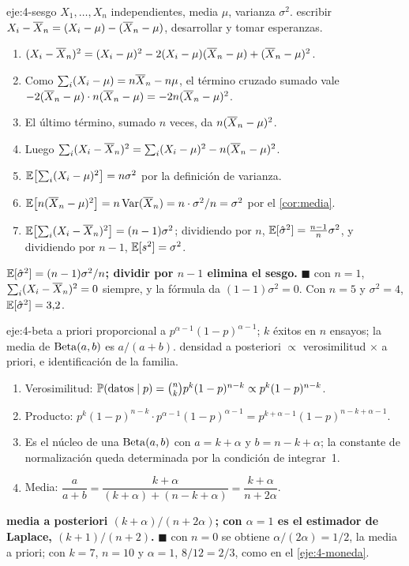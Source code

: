 \begin{solucion}{eje:4-sesgo}
\datos $X_1,\dots,X_n$ independientes, media $\mu$, varianza $\sigma^{2}$.
\planteamiento escribir $X_i-\overline{X}_n=(X_i-\mu)-(\overline{X}_n-\mu)$, desarrollar y tomar esperanzas.
\pasos
\begin{enumerate}[label=\arabic*.]
  \item $(X_i-\overline{X}_n)^{2}=(X_i-\mu)^{2}-2(X_i-\mu)(\overline{X}_n-\mu)+(\overline{X}_n-\mu)^{2}$.
  \item Como $\sum_i(X_i-\mu)=n\overline{X}_n-n\mu$, el término cruzado sumado vale $-2(\overline{X}_n-\mu)\cdot n(\overline{X}_n-\mu)=-2n(\overline{X}_n-\mu)^{2}$.
  \item El último término, sumado $n$ veces, da $n(\overline{X}_n-\mu)^{2}$.
  \item Luego $\sum_i(X_i-\overline{X}_n)^{2}=\sum_i(X_i-\mu)^{2}-n(\overline{X}_n-\mu)^{2}$.
  \item $\mathbb{E}\bigl[\sum_i(X_i-\mu)^{2}\bigr]=n\sigma^{2}$ por la definición de varianza.
  \item $\mathbb{E}\bigl[n(\overline{X}_n-\mu)^{2}\bigr]=n\operatorname{Var}(\overline{X}_n)=n\cdot\sigma^{2}/n=\sigma^{2}$ por el \cref{cor:media}.
  \item $\mathbb{E}\bigl[\sum_i(X_i-\overline{X}_n)^{2}\bigr]=(n-1)\sigma^{2}$; dividiendo por $n$, $\mathbb{E}[\hat\sigma^{2}]=\frac{n-1}{n}\sigma^{2}$, y dividiendo por $n-1$, $\mathbb{E}[s^{2}]=\sigma^{2}$.
\end{enumerate}
\resultado \textbf{$\mathbb{E}[\hat\sigma^{2}]=(n-1)\sigma^{2}/n$; dividir por $n-1$ elimina el sesgo.} $\blacksquare$
\comprobacion con $n=1$, $\sum_i(X_i-\overline{X}_n)^{2}=0$ siempre, y la fórmula da $(1-1)\sigma^{2}=0$. Con $n=5$ y $\sigma^{2}=4$, $\mathbb{E}[\hat\sigma^{2}]=3{,}2$.
\end{solucion}

\begin{solucion}{eje:4-beta}
\datos a priori proporcional a $p^{\alpha-1}(1-p)^{\alpha-1}$; $k$ éxitos en $n$ ensayos; la media de $\operatorname{Beta}(a,b)$ es $a/(a+b)$.
\planteamiento densidad a posteriori $\propto$ verosimilitud $\times$ a priori, e identificación de la familia.
\pasos
\begin{enumerate}[label=\arabic*.]
  \item Verosimilitud: $\mathbb{P}(\text{datos}\mid p)=\binom nk p^{k}(1-p)^{n-k}\propto p^{k}(1-p)^{n-k}$.
  \item Producto: $p^{k}(1-p)^{n-k}\cdot p^{\alpha-1}(1-p)^{\alpha-1}=p^{k+\alpha-1}(1-p)^{n-k+\alpha-1}$.
  \item Es el núcleo de una $\operatorname{Beta}(a,b)$ con $a=k+\alpha$ y $b=n-k+\alpha$; la constante de normalización queda determinada por la condición de integrar~1.
  \item Media: $\dfrac{a}{a+b}=\dfrac{k+\alpha}{(k+\alpha)+(n-k+\alpha)}=\dfrac{k+\alpha}{n+2\alpha}$.
\end{enumerate}
\resultado \textbf{media a posteriori $(k+\alpha)/(n+2\alpha)$; con $\alpha=1$ es el estimador de Laplace, $(k+1)/(n+2)$.} $\blacksquare$
\comprobacion con $n=0$ se obtiene $\alpha/(2\alpha)=1/2$, la media a priori; con $k=7$, $n=10$ y $\alpha=1$, $8/12=2/3$, como en el \cref{eje:4-moneda}.
\end{solucion}

